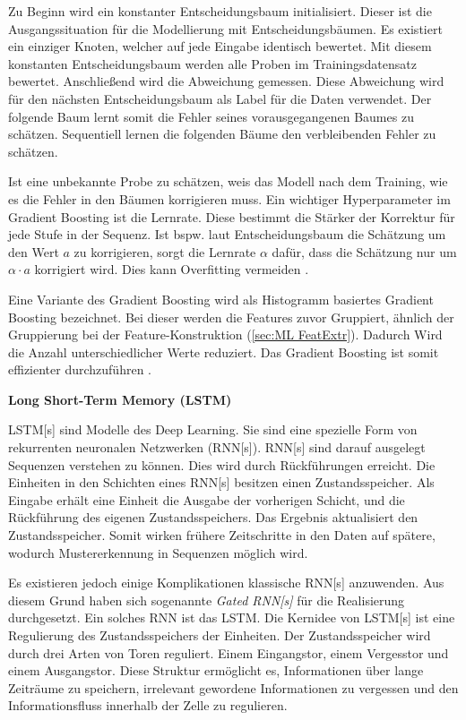 Zu Beginn wird ein konstanter Entscheidungsbaum initialisiert. Dieser ist die Ausgangssituation für die Modellierung mit Entscheidungsbäumen. Es existiert ein einziger Knoten, welcher auf jede Eingabe identisch bewertet. Mit diesem konstanten Entscheidungsbaum werden alle Proben im \gls{Trainingsdatensatz} bewertet. Anschließend wird die Abweichung gemessen. Diese Abweichung wird für den nächsten Entscheidungsbaum als \gls{Label} für die Daten verwendet. Der folgende Baum lernt somit die Fehler seines vorausgegangenen Baumes zu schätzen. Sequentiell lernen die folgenden Bäume den verbleibenden Fehler zu schätzen. \par

Ist eine unbekannte Probe zu schätzen, weis das Modell nach dem Training, wie es die Fehler in den Bäumen korrigieren muss. Ein wichtiger \gls{Hyperparameter} im Gradient Boosting ist die Lernrate. Diese bestimmt die Stärker der Korrektur für jede Stufe in der Sequenz. Ist bspw. laut Entscheidungsbaum die Schätzung um den Wert \(a\) zu korrigieren, sorgt die Lernrate \(\alpha\) dafür, dass die Schätzung nur um \(\alpha \cdot a\) korrigiert wird. Dies kann Overfitting vermeiden \cite{Burkov.2019}. \par

Eine Variante des Gradient Boosting wird als Histogramm basiertes Gradient Boosting bezeichnet. Bei dieser werden die Features zuvor Gruppiert, ähnlich der Gruppierung bei der Feature-Konstruktion (\ref{sec:ML FeatExtr}). Dadurch Wird die Anzahl unterschiedlicher Werte reduziert. Das Gradient Boosting ist somit effizienter durchzuführen \cite{Ke.2017}. 
\dubpar


\textbf{Long Short-Term Memory (\acrshort{LSTM})} \par
\acrshort{LSTM}[s] sind Modelle des \gls{Deep Learning}. Sie sind eine spezielle Form von rekurrenten neuronalen Netzwerken (\acrshort{RNN}[s]). \acrshort{RNN}[s] sind darauf ausgelegt Sequenzen verstehen zu können. Dies wird durch Rückführungen erreicht. Die Einheiten in den Schichten eines \acrshort{RNN}[s] besitzen einen Zustandsspeicher. Als Eingabe erhält eine Einheit die Ausgabe der vorherigen Schicht, und die Rückführung des eigenen Zustandsspeichers. Das Ergebnis aktualisiert den Zustandsspeicher. Somit wirken frühere Zeitschritte in den Daten auf spätere, wodurch Mustererkennung in Sequenzen möglich wird.\par

Es existieren jedoch einige Komplikationen klassische \acrshort{RNN}[s] anzuwenden. Aus diesem Grund haben sich sogenannte \textit{Gated \acrshort{RNN}[s]} für die Realisierung durchgesetzt. Ein solches \acrshort{RNN} ist das \acrshort{LSTM}. Die Kernidee von \acrshort{LSTM}[s] ist eine Regulierung des Zustandsspeichers der Einheiten. Der Zustandsspeicher wird durch drei Arten von Toren reguliert. Einem Eingangstor, einem Vergesstor und einem Ausgangstor. Diese Struktur ermöglicht es, Informationen über lange Zeiträume zu speichern, irrelevant gewordene Informationen zu vergessen und den Informationsfluss innerhalb der Zelle zu regulieren.

